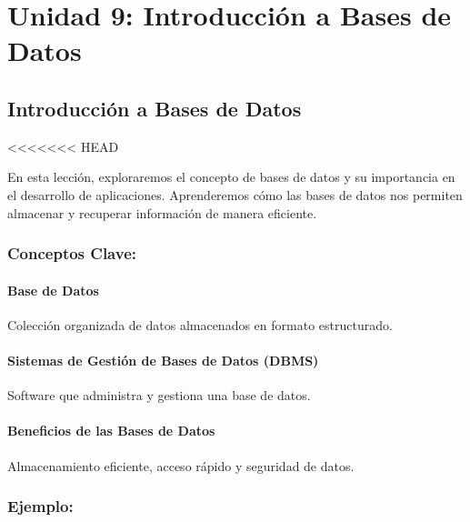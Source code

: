 \documentclass[
  a4paper,
  onepage,
  openany]{scrreprt}
\begin{document}
\part{Unidad 9: Introducción a Bases de Datos}

\hypertarget{introducciuxf3n-a-bases-de-datos}{%
\chapter{Introducción a Bases de
Datos}\label{introducciuxf3n-a-bases-de-datos}}

\textless\textless\textless\textless\textless\textless\textless{} HEAD

En esta lección, exploraremos el concepto de bases de datos y su
importancia en el desarrollo de aplicaciones. Aprenderemos cómo las
bases de datos nos permiten almacenar y recuperar información de manera
eficiente.

\hypertarget{conceptos-clave-60}{%
\section{Conceptos Clave:}\label{conceptos-clave-60}}

\hypertarget{base-de-datos}{%
\subsection{Base de Datos}\label{base-de-datos}}

Colección organizada de datos almacenados en formato estructurado.

\hypertarget{sistemas-de-gestiuxf3n-de-bases-de-datos-dbms}{%
\subsection{Sistemas de Gestión de Bases de Datos
(DBMS)}\label{sistemas-de-gestiuxf3n-de-bases-de-datos-dbms}}

Software que administra y gestiona una base de datos.

\hypertarget{beneficios-de-las-bases-de-datos}{%
\subsection{Beneficios de las Bases de
Datos}\label{beneficios-de-las-bases-de-datos}}

Almacenamiento eficiente, acceso rápido y seguridad de datos.

\hypertarget{ejemplo-62}{%
\section{Ejemplo:}\label{ejemplo-62}}
\end{document}

